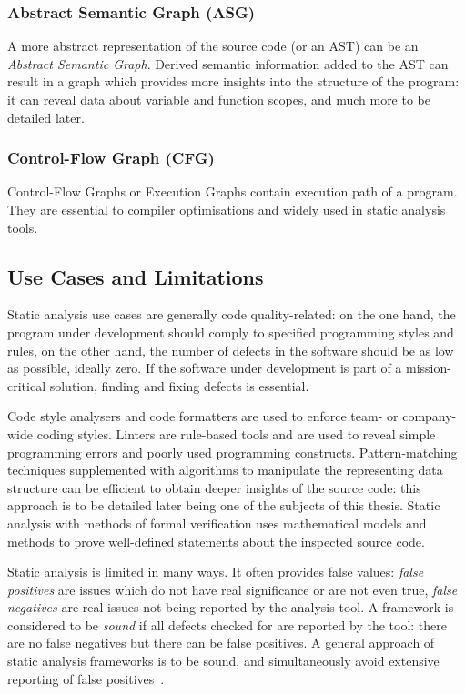 \subsubsection{Abstract Semantic Graph (ASG)}

A more abstract representation of the source code (or an AST) can be an \emph{Abstract Semantic Graph}. Derived semantic information added to the AST can result in a graph which provides more insights into the structure of the program: it can reveal data about variable and function scopes, and much more to be detailed later.


\subsubsection{Control-Flow Graph (CFG)}

Control-Flow Graphs or Execution Graphs contain execution path of a program. They are essential to compiler optimisations and widely used in static analysis tools.


\subsection{Use Cases and Limitations}

Static analysis use cases are generally code quality-related: on the one hand, the program under development should comply to specified programming styles and rules, on the other hand, the number of defects in the software should be as low as possible, ideally zero. If the software under development is part of a mission-critical solution, finding and fixing defects is essential.

Code style analysers and code formatters are used to enforce team- or company-wide coding styles. Linters are rule-based tools and are used to reveal simple programming errors and poorly used programming constructs. Pattern-matching techniques supplemented with algorithms to manipulate the representing data structure can be efficient to obtain deeper insights of the source code: this approach is to be detailed later being one of the subjects of this thesis. Static analysis with methods of formal verification uses mathematical models and methods to prove well-defined statements about the inspected source code.

Static analysis is limited in many ways. It often provides false values: \emph{false positives} are issues which do not have real significance or are not even true, \emph{false negatives} are real issues not being reported by the analysis tool. A framework is considered to be \emph{sound} if all defects checked for are reported by the tool: there are no false negatives but there can be false positives. A general approach of static analysis frameworks is to be sound, and simultaneously avoid extensive reporting of false positives~\cite{emanuelsson2008comparative}.

